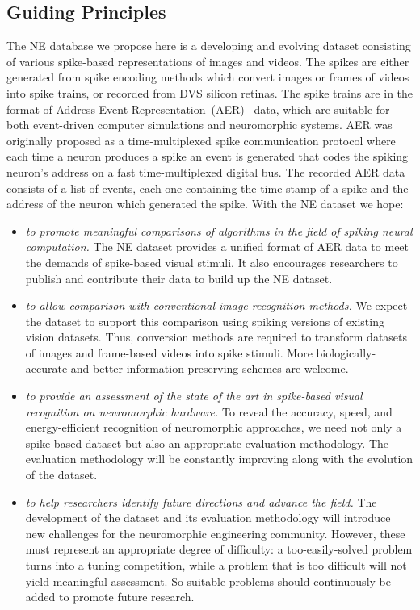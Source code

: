\subsection{Guiding Principles}
The NE database we propose here is a developing and evolving dataset consisting of various spike-based representations of images and videos.
The spikes are either generated from spike encoding methods which convert images or frames of videos into spike trains, or recorded from DVS silicon retinas.
The spike trains are in the format of Address-Event Representation~(AER)~\cite{mahowald1992vlsi} data, which are suitable for both event-driven computer simulations and neuromorphic systems.
AER was originally proposed as a time-multiplexed spike communication protocol where each time a neuron produces a spike an event is generated that codes the spiking neuron's address on a fast time-multiplexed digital bus.
The recorded AER data consists of a list of events, each one containing the time stamp of a spike and the address of the neuron which generated the spike.
With the NE dataset we hope:
\begin{itemize}
	\item \textit{to promote meaningful comparisons of algorithms in the field of spiking neural computation.}
	The NE dataset provides a unified format of AER data to meet the demands of spike-based visual stimuli.
	It also encourages researchers to publish and contribute their data to build up the NE dataset.
	\item \textit{to allow comparison with conventional image recognition methods.}
	We expect the dataset to support this comparison using spiking versions of existing vision datasets.
	Thus, conversion methods are required to transform datasets of images and frame-based videos into spike stimuli.
	More biologically-accurate and better information preserving schemes are welcome.
	
	\item \textit{to provide an assessment of the state of the art in spike-based visual recognition on neuromorphic hardware.}
	To reveal the accuracy, speed, and energy-efficient recognition of neuromorphic approaches, we need not only a spike-based dataset but also an appropriate evaluation methodology.
	The evaluation methodology will be constantly improving along with the evolution of the dataset.
	\item \textit{to help researchers identify future directions and advance the field.}
	The development of the dataset and its evaluation methodology will introduce new challenges for the neuromorphic engineering community.
	However, these must represent an appropriate degree of difficulty: a too-easily-solved problem turns into a tuning competition, while a problem that is too difficult will not yield meaningful assessment.
	So suitable problems should continuously be added to promote future research.  
\end{itemize}


